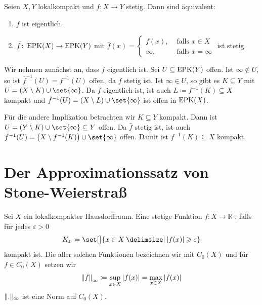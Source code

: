 \begin{satz}[{name=[eigentliche Abbildungen und Fortsetzungen]},label=satz:eigentlich-fortsetzungen]
	Seien $X,Y$ lokalkompakt und $f \colon X \to Y$ stetig. Dann sind äquivalent:
	\begin{enumerate}[(1)]
		\item $f$ ist eigentlich.
		\item $\bar{f} \colon \operatorname{EPK}(X) \to \operatorname{EPK}(Y) $ mit 
		\(
			\bar{f} (x) = \begin{cases}
				f(x), &\text{ falls }x \in X\\
				\infty, &\text{ falls } x = \infty
			\end{cases} 
		\)
		ist stetig.
	\end{enumerate}
\end{satz}
\begin{beweis}
	Wir nehmen zunächst an, dass $f$ eigentlich ist.
	Sei $U \subseteq \operatorname{EPK}(Y)$ offen.
	Ist $\infty \notin U$, so ist $\bar{f}^{-1}(U)= f ^{-1}(U)$ offen, da $f$ stetig ist.
	Ist $\infty \in U$, so gibt es $K \subseteq Y$ mit $U = (X \setminus K) \cup \set{\infty}$.
	Da $f$ eigentlich ist, ist auch $L \coloneqq f ^{-1}(K) \subseteq X$ kompakt und $\bar f ^{-1} (U) = (X \setminus L) \cup \set{\infty}$ ist offen in $\operatorname{EPK}(X)$.
	
	Für die andere Implikation betrachten wir $K \subseteq Y$ kompakt.
	Dann ist $U = (Y \setminus K) \cup \set{\infty} \subseteq Y$ offen.
	Da $\bar f$ stetig ist, ist auch $\bar{f}^{-1} (U) = \enbrace*{X \setminus f ^{-1}(K)} \cup \set{\infty}$ offen.
	Damit ist $f ^{-1}(K) \subseteq X$ kompakt.
\end{beweis}

\newpage
\section{Der Approximationssatz von Stone-Weierstraß} %

\begin{definition}[{name=[Im Unendlichen verschwindende Funktionen]},label=def:unendlich-verschwinden]
	Sei $X$ ein lokalkompakter Hausdorffraum. 
	Eine stetige Funktion $f \colon X \to \mathbb{R}$ , falls für jedes 
	$\varepsilon >0$ 
	\[
		K_\varepsilon \coloneqq \set[\big]{x \in X \given \abs{f(x)} \ge \varepsilon} 
	\] 
	kompakt ist. 
	Die  aller solchen Funktionen bezeichnen wir mit $C_0(X)$ und für $f \in C_0 (X) $ setzen wir 
	\[
		\norm*{f}_\infty \coloneqq \sup_{x \in X} \,\abs*{f(x)} = \max_{x \in X} \,\abs*{f(x)}  
	\]
	$\Vert.\Vert_\infty$ ist eine Norm auf $C_0(X)$.
\end{definition}

